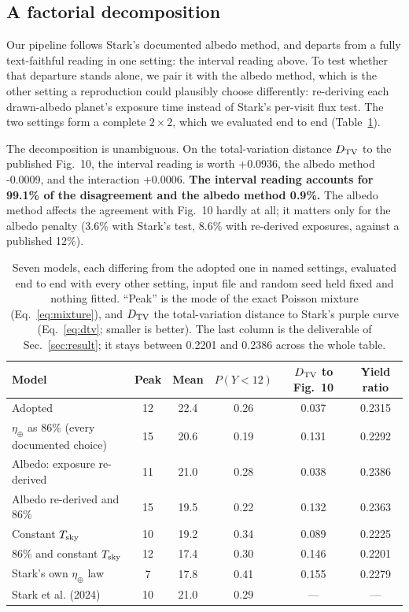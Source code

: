 \documentclass[11pt,a4paper]{article}
\begin{document}
\subsection{A factorial decomposition}

Our pipeline follows Stark's documented albedo method, and departs from a fully text-faithful
reading in one setting: the interval reading above. To test whether that departure stands alone,
we pair it with the albedo method, which is the other setting a reproduction could plausibly
choose differently: re-deriving each drawn-albedo planet's exposure time instead of Stark's
per-visit flux test. The two settings form a complete $2\times2$, which we evaluated end to end
(Table~\ref{tab:variants}).

The decomposition is unambiguous. On the total-variation distance $D_{\rm TV}$ to the published
Fig.~10, the
interval reading is worth +0.0936, the albedo method -0.0009, and the interaction
+0.0006. \textbf{The interval reading accounts for 99.1\% of the disagreement and
the albedo method 0.9\%.} The albedo method affects the agreement with Fig.~10 hardly
at all; it matters only for the albedo penalty (3.6\% with Stark's test,
8.6\% with re-derived exposures, against a published 12\%).

\begin{table}[htbp]
\centering
\small
\begin{tabular}{lccccc}
\toprule
\textbf{Model} & \textbf{Peak} & \textbf{Mean} & \textbf{$P(Y<12)$} & \textbf{$D_{\rm TV}$ to Fig.~10} &
\textbf{Yield ratio} \\
\midrule
Adopted                              & 12  & 22.4  & 0.26  & 0.037  & 0.2315 \\
$\eta_\oplus$ as 86\% (every documented choice) & 15 & 20.6 & 0.19 & 0.131 & 0.2292 \\
Albedo: exposure re-derived          & 11   & 21.0   & 0.28   & 0.038   & 0.2386 \\
Albedo re-derived and 86\%           & 15  & 19.5  & 0.22  & 0.132  & 0.2363 \\
Constant $T_{\rm sky}$               & 10   & 19.2   & 0.34   & 0.089   & 0.2225 \\
86\% and constant $T_{\rm sky}$      & 12  & 17.4  & 0.30  & 0.146  & 0.2201 \\
Stark's own $\eta_\oplus$ law        & 7   & 17.8   & 0.41   & 0.155   & 0.2279 \\
\midrule
Stark et al. (2024)                    & 10   & 21.0             & 0.29              & ---            & --- \\
\bottomrule
\end{tabular}
\caption{Seven models, each differing from the adopted one in named settings, evaluated end to
end with every other setting, input file and random seed held fixed and nothing fitted.
``Peak'' is the mode of the exact Poisson mixture (Eq.~\ref{eq:mixture}), and $D_{\rm TV}$ the
total-variation distance to Stark's purple curve (Eq.~\ref{eq:dtv}; smaller is better). The last
column is the deliverable of
Sec.~\ref{sec:result}; it stays between 0.2201 and 0.2386 across the whole
table.}
\label{tab:variants}
\end{table}
\end{document}
